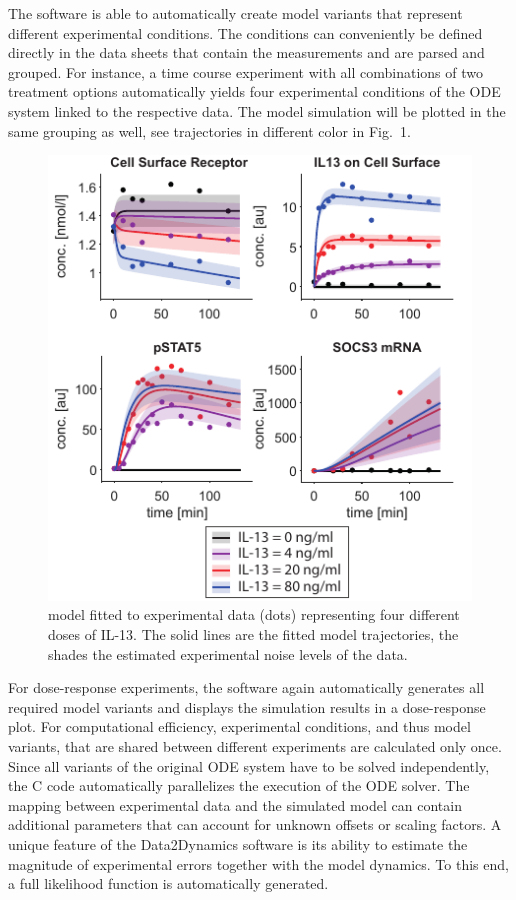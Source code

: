 \documentclass{bioinfo}
\begin{document}
The software is able to automatically create model variants that 
represent different experimental conditions. The conditions can conveniently be defined directly in 
the data sheets that contain the measurements and are parsed and 
grouped. For instance, a time course experiment with all combinations of two treatment 
options automatically yields four experimental conditions of the ODE system linked to the 
respective data. The model simulation will be plotted in the same grouping as well, see 
trajectories in different color in Fig.~1. 
\begin{figure}[!tpb]
\centerline{\includegraphics[width=\linewidth]{Figure_D2D_AppNote_v4.pdf}}
\caption{\citet{Raia:2011vn} model fitted to experimental data (dots) representing four 
different doses of IL-13. The solid lines are the fitted model trajectories, the shades 
the estimated experimental noise levels of the data.}\label{fig:01}
\end{figure}
For dose-response experiments, the software again automatically generates all required 
model variants and displays the simulation results in a dose-response plot. For 
computational efficiency, experimental conditions, and thus model variants, that are 
shared between different experiments are calculated only once. Since all variants of the 
original ODE system have to be solved independently, the C code automatically 
parallelizes the execution of the ODE solver. The mapping between experimental data 
and the simulated model can contain additional parameters that can account for 
unknown offsets or scaling factors. A unique feature of the Data2Dynamics software is its 
ability to estimate the magnitude of experimental errors together with the model 
dynamics. To this end, a full likelihood function is automatically generated.
\end{document}
